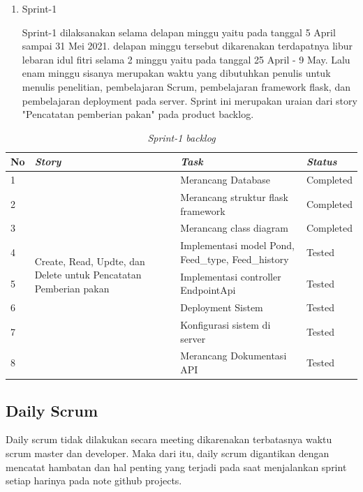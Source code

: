 	\begin{enumerate}
	
		\item Sprint-1
		
		Sprint-1 dilaksanakan selama delapan minggu yaitu pada tanggal 5 April sampai 31 Mei 2021. delapan minggu tersebut dikarenakan terdapatnya libur lebaran idul fitri selama 2 minggu yaitu pada tanggal 25 April - 9 May. Lalu enam minggu sisanya merupakan waktu yang dibutuhkan penulis untuk menulis penelitian, pembelajaran Scrum, pembelajaran framework flask, dan pembelajaran deployment pada server. Sprint ini merupakan uraian dari story "Pencatatan pemberian pakan" pada product backlog.
		
	\end{enumerate}
	
	\begin{table}[H]
	\caption{\textit{Sprint-1 backlog}}
	\label{sprint1_backlog}
	\begin{tabular}{@{} |p{0.5cm}|p{5cm}|p{5cm}|p{2cm}| @{}}
		\hline
		\textbf{No} & \textbf{\textit{Story}} & \textbf{\textit{Task}} & \textbf{\textit{Status}} \\
		\hline
		1 & \multirow{10}{5cm}{Create, Read, Updte, dan Delete untuk Pencatatan Pemberian pakan} & Merancang Database & Completed\\
		\cline{1-1}\cline{3-4}
		2 & & Merancang struktur flask framework & Completed\\
		\cline{1-1}\cline{3-4}
		3 & & Merancang class diagram & Completed\\
		\cline{1-1}\cline{3-4}
		4 & & Implementasi model Pond, Feed\_type, Feed\_history & Tested\\
		\cline{1-1}\cline{3-4}
		5 & & Implementasi controller EndpointApi & Tested\\
		\cline{1-1}\cline{3-4}
		6 & & Deployment Sistem & Tested\\
		\cline{1-1}\cline{3-4}
		7 & & Konfigurasi sistem di server & Tested\\
		\cline{1-1}\cline{3-4}
		8 & & Merancang Dokumentasi API & Tested\\
		\hline
	\end{tabular}
	\end{table}
	
	\subsection{Daily Scrum}
	
	Daily scrum tidak dilakukan secara meeting dikarenakan terbatasnya waktu scrum master dan developer. Maka dari itu, daily scrum digantikan dengan mencatat hambatan dan hal penting yang terjadi pada saat menjalankan sprint setiap harinya pada note github projects.
	
